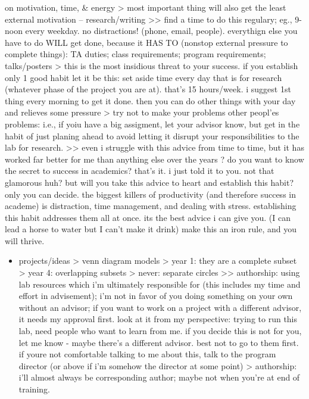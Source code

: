 \documentclass[
]{book}
\providecommand{\tightlist}{%
  \setlength{\itemsep}{0pt}\setlength{\parskip}{0pt}}
\begin{document}
on motivation, time, \& energy
\textgreater{} most important thing will also get the least external motivation -- research/writing
\textgreater\textgreater{} find a time to do this regulary; eg., 9-noon every weekday. no distractions! (phone, email, people).
everythign else you have to do WILL get done, because it HAS TO (nonstop external pressure to complete things): TA duties; class requirements; program requirements; talks/posters
\textgreater{} this is the most insidious threat to your success. if you establish only 1 good habit let it be this: set aside time every day that is for research (whatever phase of the project you are at). that's 15 hours/week. i suggest 1st thing every morning to get it done. then you can do other things with your day and relieves some pressure
\textgreater{} try not to make your problems other peopl'es problems: i.e., if yoiu have a big assigment, let your advisor know, but get in the habit of just planing ahead to avoid letting it disrupt your responsibilities to the lab for research.
\textgreater\textgreater{} even i struggle with this advice from time to time, but it has worked far better for me than anything else over the years
? do you want to know the secret to success in academics? that's it. i just told it to you. not that glamorous huh? but will you take this advice to heart and establish this habit? only you can decide. the biggest killers of productivity (and therefore success in academe) is distraction, time management, and dealing with stress. establishing this habit addresses them all at once. its the best advice i can give you. (I can lead a horse to water but I can't make it drink) make this an iron rule, and you will thrive.

\begin{itemize}
\tightlist
\item
  projects/ideas
  \textgreater{} venn diagram models
  \textgreater{} year 1: they are a complete subset
  \textgreater{} year 4: overlapping subsets
  \textgreater{} never: separate circles
  \textgreater\textgreater{} authorship: using lab resources which i'm ultimately responsible for (this includes my time and effort in advisement); i'm not in favor of you doing something on your own without an advisor; if you want to work on a project with a different advisor, it needs my approval first. look at it from my perspective: trying to run this lab, need people who want to learn from me. if you decide this is not for you, let me know - maybe there's a different advisor. best not to go to them first. if youre not comfortable talking to me about this, talk to the program director (or above if i'm somehow the director at some point)
  \textgreater{} authorship: i'll almost always be corresponding author; maybe not when you're at end of training.
\end{itemize}
\end{document}
